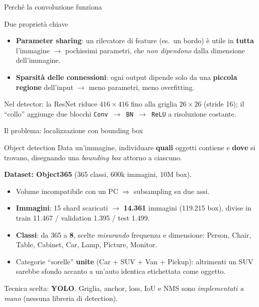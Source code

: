\documentclass[aspectratio=169]{beamer}
\begin{document}
\begin{frame}{Perché la convoluzione funziona}
  \begin{block}{Due proprietà chiave}
    \begin{itemize}
      \item \textbf{Parameter sharing}: un rilevatore di feature (es.\ un bordo)
            è utile in \textbf{tutta} l'immagine $\to$ pochissimi parametri, che
            \emph{non dipendono} dalla dimensione dell'immagine.
      \item \textbf{Sparsità delle connessioni}: ogni output dipende solo da una
            \textbf{piccola regione} dell'input $\to$ meno parametri, meno
            overfitting.
    \end{itemize}
  \end{block}
  \begin{center}
    \small Nel detector: la ResNet riduce $416\times416$ fino alla griglia
    $26\times26$ (stride 16); il ``collo'' aggiunge due blocchi
    \texttt{Conv $\to$ BN $\to$ ReLU} a risoluzione costante.
  \end{center}
\end{frame}

\begin{frame}{Il problema: localizzazione con bounding box}
  \small
  \begin{block}{Object detection}
    Data un'immagine, individuare \textbf{quali} oggetti contiene e \textbf{dove}
    si trovano, disegnando una \emph{bounding box} attorno a ciascuno.
  \end{block}
  \vspace{0.15cm}
  \textbf{Dataset: Object365} (365 classi, 600k immagini, 10M box).
  \begin{itemize}
    \item Volume incompatibile con un PC $\Rightarrow$ \alert{subsampling} su due assi.
    \item \textbf{Immagini}: 15 shard scaricati $\to$ \textbf{14.361} immagini (119.215 box),
          divise in train 11.467 / validation 1.395 / test 1.499.
    \item \textbf{Classi}: da 365 a \textbf{8}, scelte \emph{misurando} frequenza e dimensione:
          Person, Chair, Table, Cabinet, Car, Lamp, Picture, Monitor.
    \item Categorie ``sorelle'' \textbf{unite} (Car + SUV + Van + Pickup): altrimenti un SUV
          sarebbe sfondo accanto a un'auto identica etichettata come oggetto.
  \end{itemize}
  \begin{center}
    \small Tecnica scelta: \textbf{YOLO}. Griglia, anchor, loss, IoU e NMS sono
    \emph{implementati a mano} (nessuna libreria di detection).
  \end{center}
\end{frame}
\end{document}
